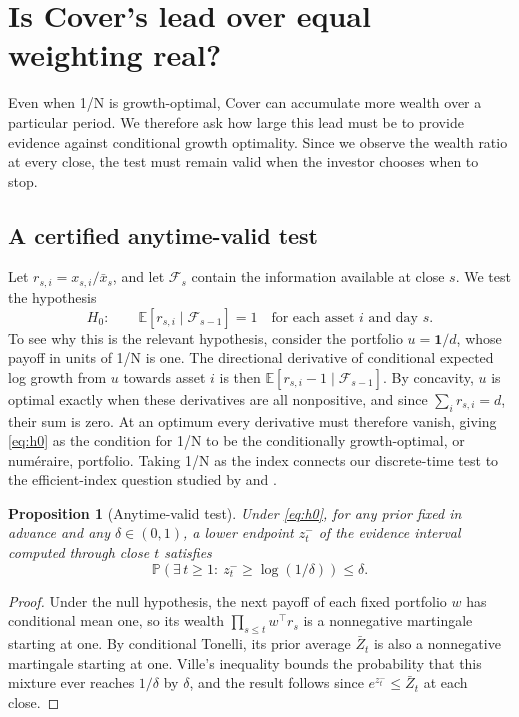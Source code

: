 \documentclass{article}
\numberwithin{equation}{section}
\newtheorem{proposition}[theorem]{Proposition}
\theoremstyle{remark}
\newcommand{\E}{\mathbb E}
\newcommand{\one}{\mathbf 1}
\begin{document}
\FloatBarrier
\section{Is Cover's lead over equal weighting real?}
\label{sec:test}

Even when 1/N is growth-optimal, Cover can accumulate more wealth
over a particular period. We therefore ask how large this lead must be
to provide evidence against conditional growth optimality. Since we
observe the wealth ratio at every close, the test must remain valid
when the investor chooses when to stop.

\subsection{A certified anytime-valid test}
Let $r_{s,i}=x_{s,i}/\bar x_s$, and let $\mathcal F_s$ contain the
information available at close $s$. We test the hypothesis
\begin{equation}\label{eq:h0}
 H_0:\qquad \E[r_{s,i}\mid\mathcal F_{s-1}]=1
 \quad\text{for each asset $i$ and day $s$.}
\end{equation}
To see why this is the relevant hypothesis, consider the portfolio
$u=\one/d$, whose payoff in units of 1/N is one. The directional
derivative of conditional expected log growth from $u$ towards asset $i$
is then $\E[r_{s,i}-1\mid\mathcal F_{s-1}]$. By concavity, $u$ is
optimal exactly when these derivatives are all nonpositive, and since
$\sum_i r_{s,i}=d$, their sum is zero. At an optimum every derivative
must therefore vanish, giving \eqref{eq:h0} as the condition for 1/N to be the
conditionally growth-optimal, or num\'eraire, portfolio. Taking 1/N as
the index connects our discrete-time test to the efficient-index
question studied by \citet{vovk2011efficient} and
\citet{vovk2016probabilityfree}.

\begin{proposition}[Anytime-valid test]\label{prop:ville}
Under \eqref{eq:h0}, for any prior fixed in advance and any
$\delta\in(0,1)$, a lower endpoint $z_t^-$ of the evidence interval
computed through close $t$ satisfies
\[
  \mathbb P\!\left(\exists\,t\ge1:\ z_t^-\ge\log(1/\delta)\right)
  \le\delta .
\]
\end{proposition}
\begin{proof}
Under the null hypothesis, the next payoff of each fixed portfolio $w$ has
conditional mean one, so its wealth $\prod_{s\le t}w^\top r_s$ is a
nonnegative martingale starting at one. By conditional Tonelli, its
prior average $\bar Z_t$ is also a nonnegative martingale starting at
one. Ville's inequality bounds the probability that this mixture ever
reaches $1/\delta$ by $\delta$, and the result follows since
$e^{z_t^-}\le\bar Z_t$ at each close.
\end{proof}
\end{document}
